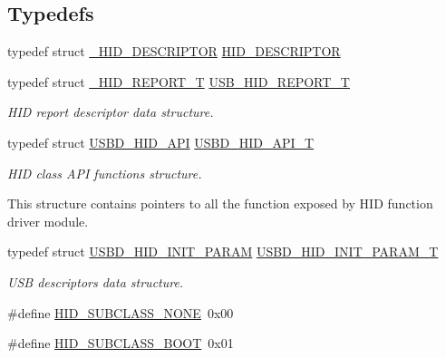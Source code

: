 \subsection*{Typedefs}
\begin{DoxyCompactItemize}
\item 
typedef struct \hyperlink{struct__HID__DESCRIPTOR}{\+\_\+\+H\+I\+D\+\_\+\+D\+E\+S\+C\+R\+I\+P\+T\+OR} \hyperlink{group__USBD__HID_ga683d4339556ecbba7d2062c3f90336e8}{H\+I\+D\+\_\+\+D\+E\+S\+C\+R\+I\+P\+T\+OR}
\item 
typedef struct \hyperlink{struct__HID__REPORT__T}{\+\_\+\+H\+I\+D\+\_\+\+R\+E\+P\+O\+R\+T\+\_\+T} \hyperlink{group__USBD__HID_gaaa1686adb431783ea4357e6899c0d39d}{U\+S\+B\+\_\+\+H\+I\+D\+\_\+\+R\+E\+P\+O\+R\+T\+\_\+T}
\begin{DoxyCompactList}\small\item\em H\+ID report descriptor data structure. \end{DoxyCompactList}\item 
typedef struct \hyperlink{structUSBD__HID__API}{U\+S\+B\+D\+\_\+\+H\+I\+D\+\_\+\+A\+PI} \hyperlink{group__USBD__HID_ga48d7b7f66a852d99dfbe2c419cc408ba}{U\+S\+B\+D\+\_\+\+H\+I\+D\+\_\+\+A\+P\+I\+\_\+T}
\begin{DoxyCompactList}\small\item\em H\+ID class A\+PI functions structure.

This structure contains pointers to all the function exposed by H\+ID function driver module. \end{DoxyCompactList}\item 
typedef struct \hyperlink{structUSBD__HID__INIT__PARAM}{U\+S\+B\+D\+\_\+\+H\+I\+D\+\_\+\+I\+N\+I\+T\+\_\+\+P\+A\+R\+AM} \hyperlink{group__USBD__HID_ga192251fa5ec461eaa9a77b76dbe7c3fa}{U\+S\+B\+D\+\_\+\+H\+I\+D\+\_\+\+I\+N\+I\+T\+\_\+\+P\+A\+R\+A\+M\+\_\+T}
\begin{DoxyCompactList}\small\item\em U\+SB descriptors data structure. \end{DoxyCompactList}\end{DoxyCompactItemize}
\begin{DoxyCompactItemize}
\item 
\#define \hyperlink{group__USBD__HID_ga1f7d3e3accc103eee60cb9a9162a7c49}{H\+I\+D\+\_\+\+S\+U\+B\+C\+L\+A\+S\+S\+\_\+\+N\+O\+NE}~0x00
\item 
\#define \hyperlink{group__USBD__HID_ga7f90b6b8acd0bce821f59ca15625da3a}{H\+I\+D\+\_\+\+S\+U\+B\+C\+L\+A\+S\+S\+\_\+\+B\+O\+OT}~0x01
\end{DoxyCompactItemize}
